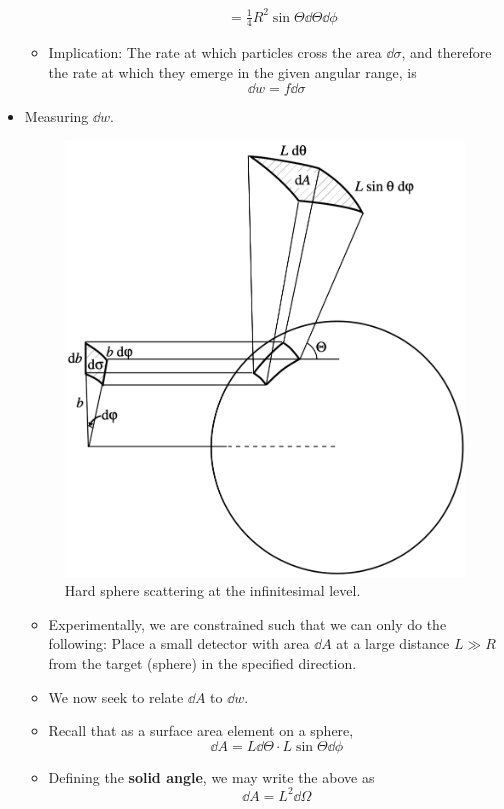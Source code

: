 \documentclass[../notes.tex]{subfiles}
\begin{document}
\begin{itemize}
\begin{itemize}
\begin{align*}
            &= \tfrac{1}{4}R^2\sin\Theta\dd{\Theta}\dd{\phi}
        \end{align*}
        \item Implication: The rate at which particles cross the area $\dd{\sigma}$, and therefore the rate at which they emerge in the given angular range, is
        \begin{equation*}
            \dd{w} = f\dd{\sigma}
        \end{equation*}
    \end{itemize}
    \item Measuring $\dd{w}$.
    \begin{figure}[h!]
        \centering
        \includegraphics[width=0.5\linewidth]{../ExtFiles/scatteringHS2.png}
        \caption{Hard sphere scattering at the infinitesimal level.}
        \label{fig:scatteringHS2}
    \end{figure}
    \begin{itemize}
        \item Experimentally, we are constrained such that we can only do the following: Place a small detector with area $\dd{A}$ at a large distance $L\gg R$ from the target (sphere) in the specified direction.
        \item We now seek to relate $\dd{A}$ to $\dd{w}$.
        \item Recall that as a surface area element on a sphere,
        \begin{equation*}
            \dd{A} = L\dd{\Theta}\cdot L\sin\Theta\dd{\phi}
        \end{equation*}
        \item Defining the \textbf{solid angle}, we may write the above as
        \begin{equation*}
            \dd{A} = L^2\dd{\Omega}
        \end{equation*}

\end{itemize}
\end{itemize}
\end{document}
